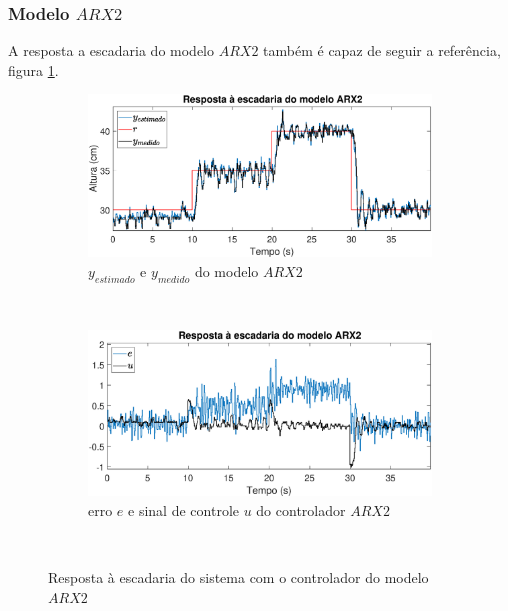 \subsubsection{Modelo $ARX2$}
A resposta a escadaria do modelo $ARX2$ também é capaz de seguir a referência, figura \ref{fig:stairrarx2y}.

\begin{figure}[htb]
	\centering
	\begin{subfigure}[t]{0.48\textwidth}
		\includegraphics[width=1\linewidth]{stairrarx2y}
		\caption[$y_{estimado}$ e $y_{medido}$ do modelo $ARX2$]{$y_{estimado}$ e $y_{medido}$ do modelo $ARX2$}
		\label{fig:stairrarx2y}
	\end{subfigure}
	~ %
	\begin{subfigure}[t]{0.48\textwidth}
		\includegraphics[width=1\linewidth]{stairrarx2e}
		\caption[erro $e$ e sinal de controle $u$ do controlador $ARX2$]{erro $e$ e sinal de controle $u$ do controlador $ARX2$}
		\label{fig:stairrarx2e}
	\end{subfigure}
	~ %
	
	\caption{Resposta à escadaria do sistema com o controlador do modelo $ARX2$}\label{fig:stairrarx2}
\end{figure}

